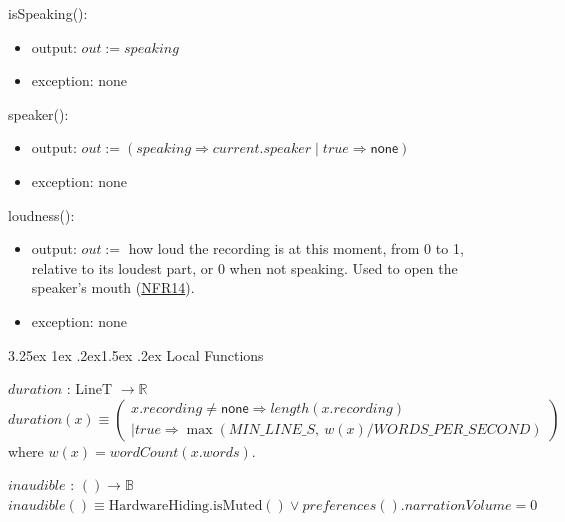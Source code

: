\documentclass[10pt, titlepage]{article}
\makeatletter
\newcommand{\srsurl}{https://team-hindsight.github.io/ophthamology-game/SRS/SRS.pdf}
\newcommand{\srsitemref}[2]{\href{\srsurl\#nameddest=#1}{#2}}
\renewcommand\paragraph{\@startsection{paragraph}{4}{\z@}%
  {3.25ex \@plus 1ex \@minus .2ex}{1.5ex \@plus .2ex}%
  {\normalfont\normalsize\bfseries}}
\newcommand{\B}{\mathbb{B}}
\newcommand{\R}{\mathbb{R}}
\newcommand{\T}[1]{\mathit{#1}}          %
\newcommand{\V}[1]{\mathsf{#1}}          %
\newcommand{\out}{\mathit{out}}
\newcommand{\true}{\mathit{true}}
\makeatother
\begin{document}
\begin{samepage}
\noindent isSpeaking():
\begin{itemize}
\item output: $\out := \T{speaking}$
\item exception: none
\end{itemize}
\end{samepage}
\par\pagebreak[0]

\begin{samepage}
\noindent speaker():
\begin{itemize}
\item output: $\out := (\T{speaking} \Rightarrow \T{current}.\T{speaker} \mid
  \true \Rightarrow \V{none})$
\item exception: none
\end{itemize}
\end{samepage}
\par\pagebreak[0]

\begin{samepage}
\noindent loudness():
\begin{itemize}
\item output: $\out :=$ how loud the recording is at this moment, from 0 to 1,
  relative to its loudest part, or 0 when not speaking. Used to open the speaker's
  mouth (\srsitemref{NFR_AVSync}{NFR14}).
\item exception: none
\end{itemize}
\end{samepage}
\par\pagebreak[0]

\paragraph{Local Functions}

$\T{duration}$ : LineT $\to \R$\\
\[\T{duration}(x) \equiv \left(\begin{array}{l}
x.\T{recording} \neq \V{none} \Rightarrow \T{length}(x.\T{recording})\\
\mid \true \Rightarrow \max(\T{MIN\_LINE\_S},\ \T{w}(x) /
\T{WORDS\_PER\_SECOND})
\end{array}\right)\]
where $\T{w}(x) = \T{wordCount}(x.\T{words})$.

\noindent $\T{inaudible}$ : $() \to \B$\\
$\T{inaudible}() \equiv \text{HardwareHiding.isMuted}() \vee
\T{preferences}().\T{narrationVolume} = 0$
\end{document}
